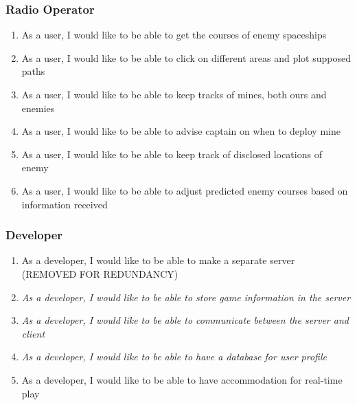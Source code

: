 \subsubsection*{Radio Operator}
\begin{enumerate}[resume, leftmargin=\listmargin]
\item As a user, I would like to be able to get the courses of enemy spaceships
\item As a user, I would like to be able to click on different areas and plot supposed paths
\item As a user, I would like to be able to keep tracks of mines, both ours and enemies
\item As a user, I would like to be able to advise captain on when to deploy mine
\item As a user, I would like to be able to keep track of disclosed locations of enemy
\item As a user, I would like to be able to adjust predicted enemy courses based on information received
\end{enumerate}
\subsubsection*{Developer}
\begin{enumerate}[resume, leftmargin=\listmargin]
\item As a developer, I would like to be able to make a separate server (REMOVED FOR REDUNDANCY)
\item \textit{As a developer, I would like to be able to store game information in the server}
\item \textit{As a developer, I would like to be able to communicate between the server and client}
\item \textit{As a developer, I would like to be able to have a database for user profile}
\item As a developer, I would like to be able to have accommodation for real-time play
\end{enumerate}
